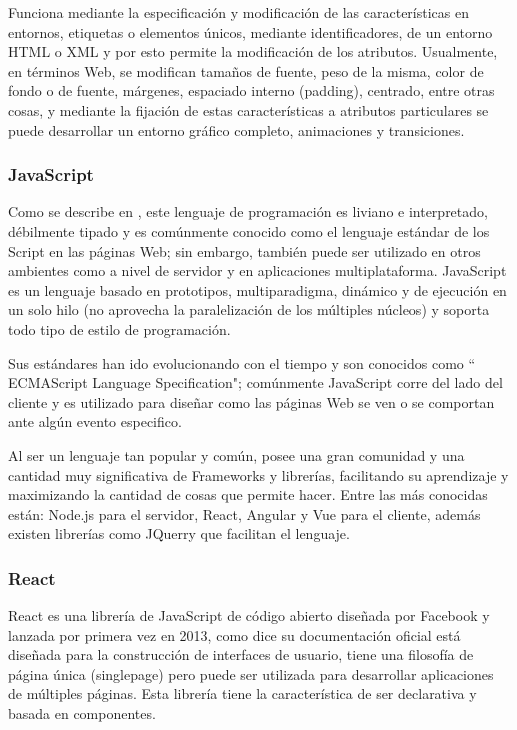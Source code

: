 Funciona mediante la especificación y modificación de las características en
entornos, etiquetas o elementos únicos, mediante identificadores, de un entorno
HTML o XML y por esto permite la modificación de los atributos.
Usualmente, en términos Web, se modifican tamaños de fuente, peso de la misma,
color de fondo o de fuente, márgenes, espaciado interno (padding), centrado,
entre otras cosas, y mediante la fijación de estas características a atributos
particulares se puede desarrollar un entorno gráfico completo, animaciones y
transiciones.

\subsubsection{JavaScript}

Como se describe en \textcite{JavaScript}, este lenguaje de programación es liviano e
interpretado, débilmente tipado y es comúnmente conocido como el lenguaje estándar
de los Script en las páginas Web; sin embargo, también puede ser utilizado en
otros ambientes como a nivel de servidor y en aplicaciones multiplataforma.
JavaScript es un lenguaje basado en prototipos, multiparadigma, dinámico y de
ejecución en un solo hilo (no aprovecha la paralelización de los múltiples
núcleos) y soporta todo tipo de estilo de programación.

Sus estándares han ido evolucionando con el tiempo y son conocidos como
`` ECMAScript Language Specification"; comúnmente JavaScript corre del lado del
cliente y es utilizado para diseñar como las páginas Web se ven o se comportan
ante algún evento especifico.

Al ser un lenguaje tan popular y común, posee una gran comunidad y una cantidad
muy significativa de Frameworks  y librerías, facilitando su aprendizaje
y maximizando la cantidad de cosas que permite hacer. Entre las más conocidas
están: Node.js para el servidor, React, Angular y Vue para el cliente, además
existen librerías como JQuerry que facilitan el lenguaje.

\subsubsection{React}

React es una librería de JavaScript de código abierto diseñada por Facebook y
lanzada por primera vez en 2013, como dice su documentación oficial \textcite{React}
está diseñada para la construcción de interfaces de usuario, tiene una filosofía
de página única (singlepage) pero puede ser utilizada para desarrollar aplicaciones
de múltiples páginas. Esta librería tiene la característica de ser declarativa
y basada en componentes.

